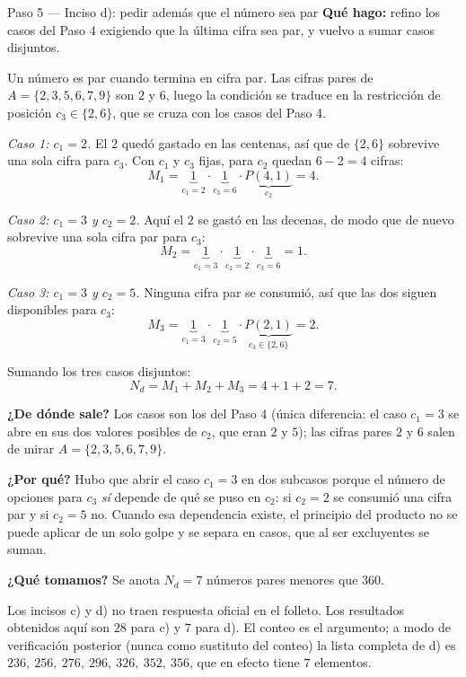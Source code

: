 \documentclass[11pt]{article}
\begin{document}
\begin{paso}{Paso 5 --- Inciso d): pedir además que el número sea par}
\textbf{Qué hago:} refino los casos del Paso 4 exigiendo que la última cifra sea par, y vuelvo a sumar casos disjuntos.

Un número es par cuando termina en cifra par. Las cifras pares de $A=\{2,3,5,6,7,9\}$ son $2$ y $6$, luego la condición se traduce en la restricción de posición $c_3\in\{2,6\}$, que se cruza con los casos del Paso 4.

\emph{Caso 1: $c_1=2$.} El $2$ quedó gastado en las centenas, así que de $\{2,6\}$ sobrevive una sola cifra para $c_3$. Con $c_1$ y $c_3$ fijas, para $c_2$ quedan $6-2=4$ cifras:
\[
  M_1 = \underbrace{1}_{c_1=2}\cdot \underbrace{1}_{c_3=6}\cdot \underbrace{P(4,1)}_{c_2} = 4 .
\]

\emph{Caso 2: $c_1=3$ y $c_2=2$.} Aquí el $2$ se gastó en las decenas, de modo que de nuevo sobrevive una sola cifra par para $c_3$:
\[
  M_2 = \underbrace{1}_{c_1=3}\cdot \underbrace{1}_{c_2=2}\cdot \underbrace{1}_{c_3=6} = 1 .
\]

\emph{Caso 3: $c_1=3$ y $c_2=5$.} Ninguna cifra par se consumió, así que las dos siguen disponibles para $c_3$:
\[
  M_3 = \underbrace{1}_{c_1=3}\cdot \underbrace{1}_{c_2=5}\cdot \underbrace{P(2,1)}_{c_3\in\{2,6\}} = 2 .
\]

Sumando los tres casos disjuntos:
\[
  N_d = M_1+M_2+M_3 = 4+1+2 = 7 .
\]

\textbf{¿De dónde sale?} Los casos son los del Paso 4 (única diferencia: el caso $c_1=3$ se abre en sus dos valores posibles de $c_2$, que eran $2$ y $5$); las cifras pares $2$ y $6$ salen de mirar $A=\{2,3,5,6,7,9\}$.

\textbf{¿Por qué?} Hubo que abrir el caso $c_1=3$ en dos subcasos porque el número de opciones para $c_3$ \emph{sí} depende de qué se puso en $c_2$: si $c_2=2$ se consumió una cifra par y si $c_2=5$ no. Cuando esa dependencia existe, el principio del producto no se puede aplicar de un solo golpe y se separa en casos, que al ser excluyentes se suman.

\textbf{¿Qué tomamos?} Se anota $N_d=7$ números pares menores que $360$.
\end{paso}

\begin{nota}
Los incisos c) y d) no traen respuesta oficial en el folleto. Los resultados obtenidos aquí son $28$ para c) y $7$ para d). El conteo es el argumento; a modo de verificación posterior (nunca como sustituto del conteo) la lista completa de d) es $236,\ 256,\ 276,\ 296,\ 326,\ 352,\ 356$, que en efecto tiene $7$ elementos.
\end{nota}
\end{document}
